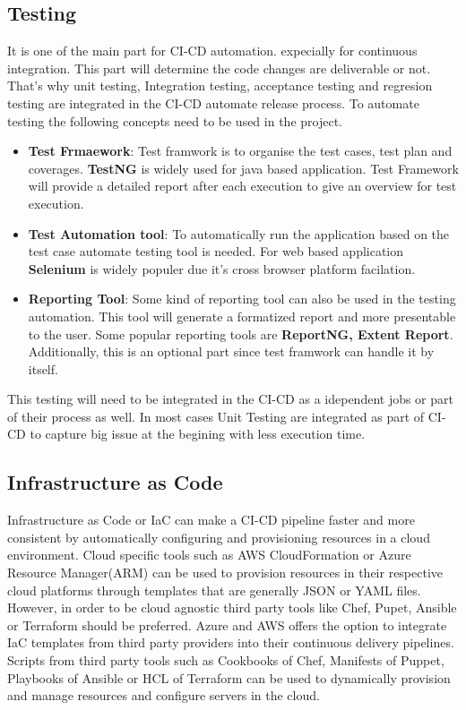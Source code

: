 \subsection{Testing}
It is one of the main part for CI-CD automation. expecially for continuous integration. This part will determine the code changes are deliverable or not. That's why unit testing, Integration testing, acceptance testing and regresion testing are integrated in the CI-CD automate release process. To automate testing the following concepts need to be used in the project.
\begin{itemize}
	\item \textbf{Test Frmaework}: Test framwork is to organise the test cases, test plan and coverages. \textbf{TestNG} is widely used for java based application. Test Framework will provide a detailed report after each execution to give an overview for test execution.
	\item \textbf{Test Automation tool}: To automatically run the application based on the test case automate testing tool is needed. For web based application \textbf{Selenium} is widely populer due it's cross browser platform facilation.
	\item \textbf{Reporting Tool}: Some kind of reporting tool can also be used in the testing automation. This tool will generate a formatized report and more presentable to the user. Some popular reporting tools are \textbf{ReportNG, Extent Report}. Additionally, this is an optional part since test framwork can handle it by itself.
\end{itemize}
This testing will need to be integrated in the CI-CD as a idependent jobs or part of their process as well. In most cases Unit Testing are integrated as part of CI-CD to capture big issue at the begining with less execution time.

\subsection{Infrastructure as Code}
Infrastructure as Code or IaC can make a CI-CD pipeline faster and more consistent by automatically configuring and provisioning resources in a cloud environment. Cloud specific tools such as AWS CloudFormation or Azure Resource Manager(ARM) can be used to provision resources in their respective cloud platforms through templates that are generally JSON or YAML files. However, in order to be cloud agnostic third party tools like Chef, Pupet, Ansible or Terraform should be preferred. Azure and AWS offers the option to integrate IaC templates  from third party providers into their continuous delivery pipelines. Scripts from third party tools such as Cookbooks of Chef, Manifests of Puppet, Playbooks of Ansible or HCL of Terraform can be used to dynamically provision and manage resources and configure servers in the cloud.
